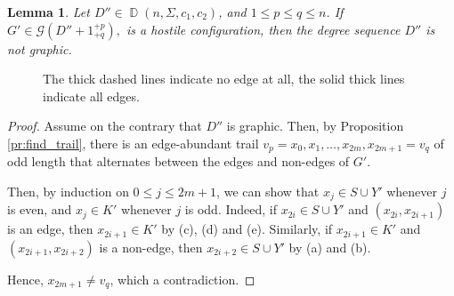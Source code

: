 \documentclass[11pt]{elsarticle}
\theoremstyle{plain}
\newtheorem{lemma}[theorem]{Lemma}
\theoremstyle{definition}
\def\G{\mathcal{G}}
\newcommand{\dds}[4]{\operatorname{\mathbb D}(#1,#2,#3,#4)}
\begin{document}
\begin{lemma}\label{lem:Sou-3}
Let $D'' \in \dds{n}{\Sigma}{c_1}{c_2}$,
and $1\le p\le q\le n$. If   $G'\in \G(D''+1_{+q}^{+p}),$ is a hostile configuration, then  the degree sequence $D''$ is not graphic.
\end{lemma}
\begin{figure}[h]
\begin{center}
\end{center}
\caption{The thick dashed lines indicate no edge at all, the solid thick lines indicate all edges.}	
\end{figure}
\begin{proof}
Assume on the contrary that $D''$ is graphic.
Then, by Proposition \ref{pr:find_trail}, there is an edge-abundant trail    $v_p=x_0,x_1,\ldots, x_{2m}, x_{2m+1}=v_q$ of odd length  that alternates between the edges and non-edges of $G'$.

Then, by induction on $0\le j\le 2m+1$, we can show that $x_j\in S\cup Y'$ whenever $j$ is even, and $x_j\in K'$ whenever $j$ is odd.  Indeed, if $x_{2i}\in S\cup Y'$ and $(x_{2i},x_{2i+1})$ is an edge, then $x_{2i+1}\in K'$ by (c), (d) and (e). Similarly, if $x_{2i+1}\in K'$ and $(x_{2i+1},x_{2i+2})$ is a non-edge, then $x_{2i+2}\in S\cup Y'$ by (a) and (b).

Hence, $x_{2m+1}\ne v_q$, which  a contradiction.
\end{proof}
\end{document}
